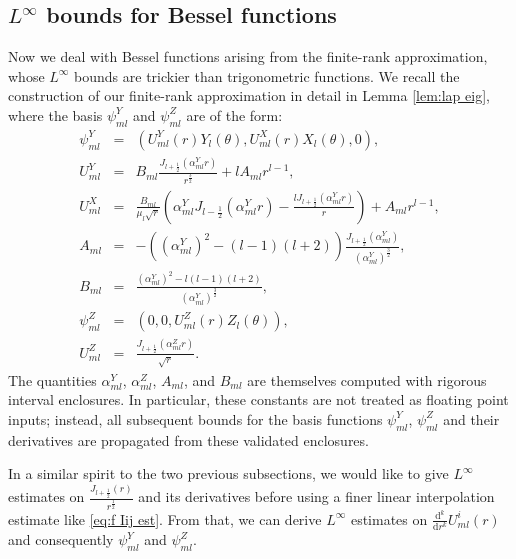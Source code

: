 \documentclass[11pt,a4paper]{article}
\numberwithin{equation}{section}
\newcommand{\mathd}{\mathrm{d}}
\begin{document}
\subsection{$L^{\infty}$ bounds for Bessel functions}\label{sec:bes ln}
Now we deal with Bessel functions arising from the finite-rank approximation, whose $L^\infty$ bounds are trickier than trigonometric functions. We recall the construction of our finite-rank approximation in detail in Lemma \ref{lem:lap eig}, where the  basis 
$\psi_{m l}^Y$ and $\psi_{m l}^Z$ are of the form:
\begin{eqnarray*}
  \psi_{m l}^Y & = & (U_{m l}^Y (r) Y_l (\theta), U_{m l}^X (r) X_l (\theta),
  0),\\
  U_{m l}^Y & = & B_{m l} \frac{J_{l + \frac{1}{2}} (\alpha^Y_{m l}
  r)}{r^{\frac{3}{2}}} + l A_{m l} r^{l - 1},\\
  U_{m l}^X & = & \frac{B_{m l}}{\mu_l \sqrt{r}} \left( \alpha^Y_{m l} J_{l -
  \frac{1}{2}} (\alpha^Y_{m l} r) - \frac{l J_{l + \frac{1}{2}} (\alpha^Y_{m
  l} r)}{r} \right) + A_{m l} r^{l - 1},\\
  A_{m l} & = & - ((\alpha^Y_{m l})^2 - (l - 1) (l + 2)) \frac{J_{l +
  \frac{1}{2}} (\alpha^Y_{m l} )}{(\alpha^Y_{m l})^{\frac{3}{2}}},\\
  B_{m l} & = & \frac{(\alpha^Y_{m l})^2 - l (l - 1) (l + 2)}{(\alpha^Y_{m
  l})^{\frac{3}{2}}},\\
  \psi_{m l}^Z & = & (0, 0, U_{m l}^Z (r) Z_l (\theta)),\\
  U_{m l}^Z & = & \frac{J_{l + \frac{1}{2}} (\alpha^Z_{m l} r)}{\sqrt{r}} .
\end{eqnarray*}
The quantities $\alpha_{ml}^{Y}$, $\alpha_{ml}^{Z}$, $A_{ml}$, and $B_{ml}$
are themselves computed with rigorous interval
enclosures. In particular, these constants are not treated as floating
point inputs; instead, all subsequent bounds for the basis functions
$\psi_{ml}^{Y}$, $\psi_{ml}^{Z}$ and their derivatives are propagated
from these validated enclosures.

In a similar spirit to the two previous subsections, we would like to give $L^\infty$ estimates on $\frac{J_{l + \frac{1}{2}} (r)}{r^{\frac{1}{2}}}$ and its derivatives before using a finer linear interpolation estimate like \eqref{eq:f Iij est}. From that, we can derive $L^\infty$ estimates on $\frac{\mathd^k}{\mathd r^k} U_{m l}^i
(r)$ and consequently $\psi_{m l}^Y$ and $\psi_{m l}^Z$.
\end{document}
